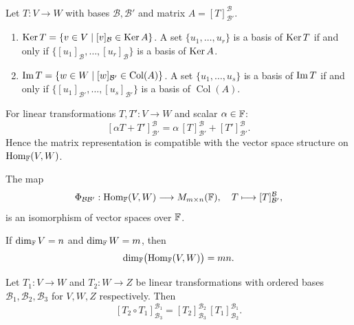 \begin{corbox}
\label{cor:ker-img-matrix}
Let $T:V\to W$ with bases $\mathcal{B},\mathcal{B}'$ and matrix
$A=[T]^{\mathcal{B}}_{\mathcal{B}'}$.
\begin{enumerate}[label=(\roman*)]
    \item $\operatorname{Ker} T = \{v\in V \mid [v]_{\mathcal{B}}\in\operatorname{Ker} A\}$.
          A set $\{u_1,\ldots,u_r\}$ is a basis of $\operatorname{Ker} T$ if and only if
          $\{[u_1]_{\mathcal{B}},\ldots,[u_r]_{\mathcal{B}}\}$ is a basis
          of $\operatorname{Ker} A$.
    \item $\operatorname{Im} T = \{w\in W \mid [w]_{\mathcal{B}'}\in\operatorname{Col}(A)\}$.
          A set $\{u_1,\ldots,u_s\}$ is a basis of $\operatorname{Im} T$ if and only if
          $\{[u_1]_{\mathcal{B}'},\ldots,[u_s]_{\mathcal{B}'}\}$ is a basis
          of $\operatorname{Col}(A)$.
\end{enumerate}
\end{corbox}

\begin{tipbox}
\label{rem:lt-add-scalar}
For linear transformations $T,T':V\to W$ and scalar $\alpha\in\mathbb{F}$:
\[
    [\alpha T + T']^{\mathcal{B}}_{\mathcal{B}'}
    = \alpha\,[T]^{\mathcal{B}}_{\mathcal{B}'} + [T']^{\mathcal{B}}_{\mathcal{B}'}.
\]
Hence the matrix representation is compatible with the vector space structure
on $\operatorname{Hom}_{\mathbb{F}}(V,W)$.
\end{tipbox}

\begin{thmbox}
\label{thm:matrix-rep-iso}
The map
\[
    \Phi_{\mathcal{B}\mathcal{B}'}: \operatorname{Hom}_{\mathbb{F}}(V,W) \longrightarrow M_{m\times n}(\mathbb{F}),
    \quad T \longmapsto [T]^{\mathcal{B}}_{\mathcal{B}'},
\]
is an isomorphism of vector spaces over $\mathbb{F}$.
\end{thmbox}

\begin{corbox}
\label{cor:dim-hom}
If $\operatorname{dim}_{\mathbb{F}} V = n$ and $\operatorname{dim}_{\mathbb{F}} W = m$, then
\[
    \operatorname{dim}_{\mathbb{F}}\bigl(\operatorname{Hom}_{\mathbb{F}}(V,W)\bigr) = mn.
\]
\end{corbox}

\begin{thmbox}
\label{thm:comp-matrix-product}
Let $T_1:V\to W$ and $T_2:W\to Z$ be linear transformations with ordered
bases $\mathcal{B}_1,\mathcal{B}_2,\mathcal{B}_3$ for $V,W,Z$ respectively.
Then
\[
    [T_2\circ T_1]^{\mathcal{B}_1}_{\mathcal{B}_3}
    = [T_2]^{\mathcal{B}_2}_{\mathcal{B}_3}\,[T_1]^{\mathcal{B}_1}_{\mathcal{B}_2}.
\]
\end{thmbox}


